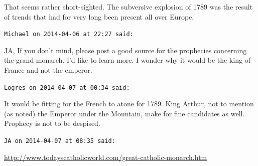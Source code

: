 \begin{footnotesize}
\begin{sffamily}
That seems rather short-sighted. The subversive explosion of 1789 was the result of trends that had for very long been present all over Europe.

\hfill

\texttt{Michael on 2014-04-06 at 22:27 said:}

JA, If you don't mind, please post a good source for the prophecies concerning the grand monarch. I'd like to learn more. I wonder why it would be the king of France and not the emperor.

\hfill

\texttt{Logres on 2014-04-07 at 00:34 said:}

It would be fitting for the French to atone for 1789. King Arthur, not to mention (as noted) the Emperor under the Mountain, make for fine candidates as well. Prophecy is not to be despised.

\hfill

\texttt{JA on 2014-04-07 at 08:35 said:}

\url{http://www.todayscatholicworld.com/great-catholic-monarch.htm}


\hfill

\end{sffamily}
\end{footnotesize}

